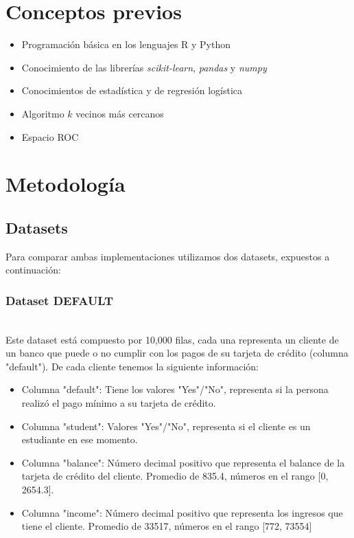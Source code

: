 \documentclass[sigconf,authorversion,nonacm]{acmart}
\begin{document}
\section{Conceptos previos}
\begin{itemize}
  \item Programación básica en los lenguajes R y Python
  \item Conocimiento de las librerías \textit{scikit-learn}, \textit{pandas} y \textit{numpy}
  \item Conocimientos de estadística y de regresión logística
  \item Algoritmo $k$ vecinos más cercanos
  \item Espacio ROC
\end{itemize}


\section{Metodología}

\subsection{Datasets}
Para comparar ambas implementaciones utilizamos dos datasets, expuestos a continuación:

\subsubsection{Dataset DEFAULT}\hfill\\
Este dataset está compuesto por 10,000 filas, cada una representa un cliente de un banco que puede o no cumplir con los pagos de su tarjeta de crédito (columna "default"). De cada cliente tenemos la siguiente información:
\begin{itemize}
  \item Columna "default": Tiene los valores "Yes"/"No", representa si la persona realizó el pago mínimo a su tarjeta de crédito.
  \item Columna "student": Valores "Yes"/"No", representa si el cliente es un estudiante en ese momento.
  \item Columna "balance": Número decimal positivo que representa el balance de la tarjeta de crédito del cliente. Promedio de 835.4, números en el rango [0, 2654.3].
  \item Columna "income": Número decimal positivo que representa los ingresos que tiene el cliente. Promedio de 33517, números en el rango [772, 73554]
\end{itemize}
\end{document}
